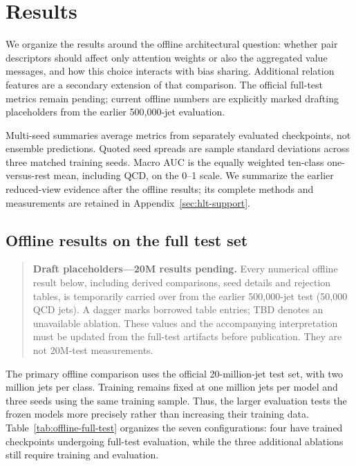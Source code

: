 \section{Results}
\label{sec:results}

We organize the results around the offline architectural question:
whether pair descriptors should affect only attention weights or also
the aggregated value messages, and how this choice interacts with bias
sharing. Additional relation features are a secondary extension of that
comparison. The official full-test metrics remain pending; current
offline numbers are explicitly marked drafting placeholders from the
earlier 500,000-jet evaluation.

Multi-seed summaries average metrics from separately evaluated checkpoints,
not ensemble predictions. Quoted seed spreads are sample standard
deviations across three matched training seeds. Macro AUC is the equally
weighted ten-class one-versus-rest mean, including QCD, on the 0--1 scale.
We summarize the earlier reduced-view evidence after the offline results;
its complete methods and measurements are retained in
Appendix~\ref{sec:hlt-support}.

\subsection{Offline results on the full test set}
\label{sec:offline-full-test-results}

\begin{quote}
\textbf{Draft placeholders---20M results pending.} Every numerical offline
result below, including derived comparisons, seed details and rejection
tables, is temporarily carried over from the earlier 500,000-jet test
(50,000 QCD jets). A dagger marks borrowed table entries; TBD denotes an
unavailable ablation. These values and the accompanying interpretation must
be updated from the full-test artifacts before publication. They are not
20M-test measurements.
\end{quote}

The primary offline comparison uses the official 20-million-jet test set,
with two million jets per class. Training remains fixed at one million jets
per model and three seeds using the same training sample. Thus, the larger
evaluation tests the frozen models more precisely rather than increasing
their training data. Table~\ref{tab:offline-full-test} organizes the seven
configurations: four have trained checkpoints undergoing full-test
evaluation, while the three additional ablations still require training
and evaluation.

